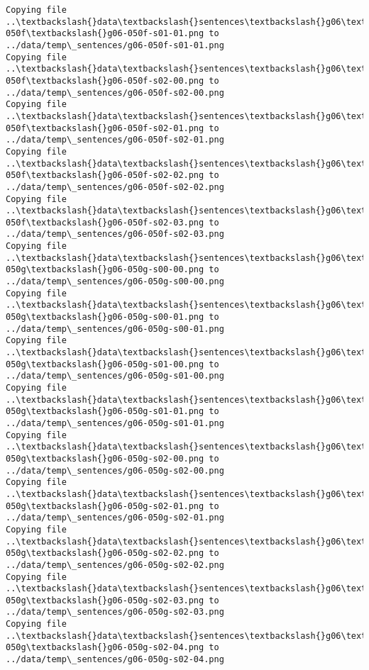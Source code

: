 \documentclass[11pt]{article}
\begin{document}
\begin{Verbatim}[commandchars=\\\{\}]
Copying file ..\textbackslash{}data\textbackslash{}sentences\textbackslash{}g06\textbackslash{}g06-050f\textbackslash{}g06-050f-s01-01.png to
../data/temp\_sentences/g06-050f-s01-01.png
Copying file ..\textbackslash{}data\textbackslash{}sentences\textbackslash{}g06\textbackslash{}g06-050f\textbackslash{}g06-050f-s02-00.png to
../data/temp\_sentences/g06-050f-s02-00.png
Copying file ..\textbackslash{}data\textbackslash{}sentences\textbackslash{}g06\textbackslash{}g06-050f\textbackslash{}g06-050f-s02-01.png to
../data/temp\_sentences/g06-050f-s02-01.png
Copying file ..\textbackslash{}data\textbackslash{}sentences\textbackslash{}g06\textbackslash{}g06-050f\textbackslash{}g06-050f-s02-02.png to
../data/temp\_sentences/g06-050f-s02-02.png
Copying file ..\textbackslash{}data\textbackslash{}sentences\textbackslash{}g06\textbackslash{}g06-050f\textbackslash{}g06-050f-s02-03.png to
../data/temp\_sentences/g06-050f-s02-03.png
Copying file ..\textbackslash{}data\textbackslash{}sentences\textbackslash{}g06\textbackslash{}g06-050g\textbackslash{}g06-050g-s00-00.png to
../data/temp\_sentences/g06-050g-s00-00.png
Copying file ..\textbackslash{}data\textbackslash{}sentences\textbackslash{}g06\textbackslash{}g06-050g\textbackslash{}g06-050g-s00-01.png to
../data/temp\_sentences/g06-050g-s00-01.png
Copying file ..\textbackslash{}data\textbackslash{}sentences\textbackslash{}g06\textbackslash{}g06-050g\textbackslash{}g06-050g-s01-00.png to
../data/temp\_sentences/g06-050g-s01-00.png
Copying file ..\textbackslash{}data\textbackslash{}sentences\textbackslash{}g06\textbackslash{}g06-050g\textbackslash{}g06-050g-s01-01.png to
../data/temp\_sentences/g06-050g-s01-01.png
Copying file ..\textbackslash{}data\textbackslash{}sentences\textbackslash{}g06\textbackslash{}g06-050g\textbackslash{}g06-050g-s02-00.png to
../data/temp\_sentences/g06-050g-s02-00.png
Copying file ..\textbackslash{}data\textbackslash{}sentences\textbackslash{}g06\textbackslash{}g06-050g\textbackslash{}g06-050g-s02-01.png to
../data/temp\_sentences/g06-050g-s02-01.png
Copying file ..\textbackslash{}data\textbackslash{}sentences\textbackslash{}g06\textbackslash{}g06-050g\textbackslash{}g06-050g-s02-02.png to
../data/temp\_sentences/g06-050g-s02-02.png
Copying file ..\textbackslash{}data\textbackslash{}sentences\textbackslash{}g06\textbackslash{}g06-050g\textbackslash{}g06-050g-s02-03.png to
../data/temp\_sentences/g06-050g-s02-03.png
Copying file ..\textbackslash{}data\textbackslash{}sentences\textbackslash{}g06\textbackslash{}g06-050g\textbackslash{}g06-050g-s02-04.png to
../data/temp\_sentences/g06-050g-s02-04.png

\end{Verbatim}
\end{document}
